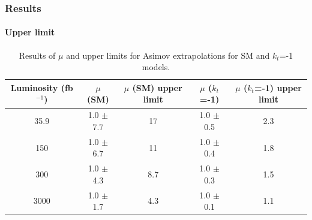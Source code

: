 \documentclass[11pt]{beamer}
\begin{document}
\begin{frame}
\frametitle{Results}
\framesubtitle{Upper limit}
\tiny{
\begin{table}[ht!]
	\caption*{Results of $\mu$ and upper limits for Asimov extrapolations for SM and $k_t$=-1 models.}
	\begin{tabular}{|c|c|c|c|c|}
		\hline
		Luminosity (fb$^{-1}$)	&$\mu$ (SM) &$\mu$ (SM) upper limit & $\mu$ ($k_t$=-1) &$\mu$ ($k_t$=-1) upper limit \\
		\hline
		35.9 & 1.0 $\pm$ 7.7 & 17 & 1.0 $\pm$ 0.5 & 2.3 \\
		\hline
		150& 1.0 $\pm$ 6.7& 11 & 1.0 $\pm$ 0.4 &1.8\\
		\hline
		300&1.0 $\pm$ 4.3 &8.7 & 1.0 $\pm$ 0.3 &1.5 \\
		\hline
		3000&1.0 $\pm$ 1.7 & 4.3 &	 1.0 $\pm$ 0.1 & 1.1\\
		\hline
	\end{tabular}
	\label{upper}
\end{table}
}
\end{frame}


\end{document}
